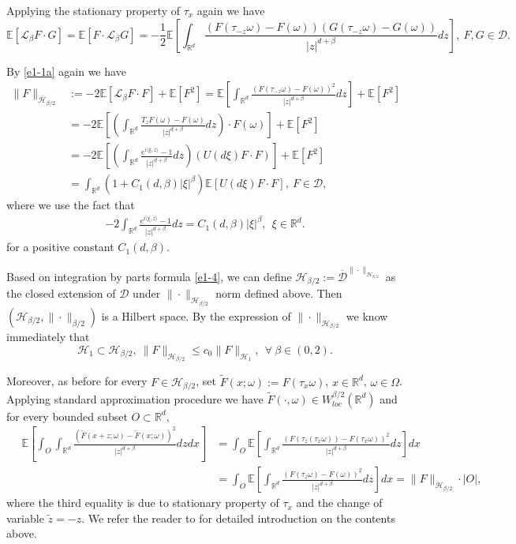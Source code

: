 \documentclass[11pt,draft, reqno]{amsart}
\renewcommand{\le}{\leqslant}
\def\LL{{\mathcal L}}
\newcommand{\D}{\mathscr{D}}
\newcommand{\HH}{\mathcal{H}}
\newcommand{\R}{\mathds R}
\newcommand{\Ee}{\mathds E}
\newcommand{\w}{\omega}
\theoremstyle{definition}
\numberwithin{equation}{section}
\begin{document}
Applying the stationary property of $\tau_x$ again we have
\begin{equation}\label{e1-4}
\Ee[\LL_{\beta}F \cdot G]=\Ee[F\cdot \LL_{\beta}G]=-\frac{1}{2}\Ee\left[\int_{\R^d}\frac{(F(\tau_{-z}\w)-F(\w))(G(\tau_{-z}\w)-G(\w))}{|z|^{d+\beta}}dz\right]
,\ F,G\in \D.
\end{equation}

By \eqref{e1-1a} again we have
\begin{equation*}
\begin{split}
\|F\|_{\HH_{\beta/2}}&:=-2\Ee[\LL_{\beta}F \cdot F]+\Ee[F^2]=
\Ee\left[\int_{\R^d}\frac{(F(\tau_{-z}\w)-F(\w))^2}{|z|^{d+\beta}}dz\right]+\Ee[F^2]\\
&=-2\Ee\left[\left(\int_{\R^d}\frac{T_{z}F(\w)-F(\w)}{|z|^{d+\beta}}dz\right)\cdot F(\w)\right]+\Ee[F^2]\\
&=-2\Ee\left[\left(\int_{\R^d}\frac{e^{i\langle \xi, z\rangle}-1}{|z|^{d+\beta}}dz\right)\left(U(d\xi)F\cdot F\right)\right]+\Ee[F^2]\\
&=\int_{\R^d}\left(1+C_1(d,\beta)|\xi|^\beta\right)\Ee[U(d\xi)F\cdot F],\ F\in \D,
\end{split}
\end{equation*}
where we use the fact that
\begin{align*}
-2\int_{\R^d}\frac{e^{i\langle \xi, z\rangle}-1}{|z|^{d+\beta}}dz=C_1(d,\beta)|\xi|^\beta,\ \ \xi\in \R^d.
\end{align*}
for a positive constant $C_1(d,\beta)$.

Based on integration by parts formula \eqref{e1-4}, we can define $\HH_{\beta/2}:=\overline{\D}^{\|\cdot\|_{\HH_{\beta/2}}}$ as
the closed extension of $\D$ under $\|\cdot\|_{\HH_{\beta/2}}$ norm defined above.
Then $\left(\HH_{\beta/2},\|\cdot\|_{\beta/2}\right)$ is a Hilbert space. By the expression of $\|\cdot\|_{\HH_{\beta/2}}$ we know immediately that
\begin{equation*}
\HH_{1}\subset \HH_{\beta/2},\ \|F\|_{\HH_{\beta/2}}\le c_0\|F\|_{\HH_1},\ \ \forall\ \beta\in (0,2).
\end{equation*}

Moreover, as before for every $F\in \HH_{\beta/2}$, set $\tilde F(x;\w):=F(\tau_x \w)$, $x\in \R^d$, $\w\in \Omega$.
Applying standard approximation procedure we have $\tilde F(\cdot,\w)\in W_{loc}^{\beta/2}(\R^d)$ and
for every bounded subset $O\subset \R^d$,
\begin{equation}\label{e1-5a}
\begin{split}
\quad \Ee\left[\int_O \int_{\R^d}\frac{(\tilde F(x+z;\w)-\tilde F(x;\w))^2}{|z|^{d+\beta}}dzdx\right]
&=\int_O\Ee\left[\int_{\R^d}\frac{(F(\tau_z (\tau_x\w))-F(\tau_x\w))^2}{|z|^{d+\beta}}dz\right]dx\\
&=\int_O \Ee\left[\int_{\R^d}\frac{(F(\tau_z \w)-F(\w))^2}{|z|^{d+\beta}}dz\right]dx=\|F\|_{\HH_{\beta/2}}\cdot |O|,
\end{split}
\end{equation}
where the third equality is due to stationary property of $\tau_x$ and the change of variable $\tilde z=-z$. We refer the reader
to \cite{PV} for detailed introduction on the contents above.
\end{document}
